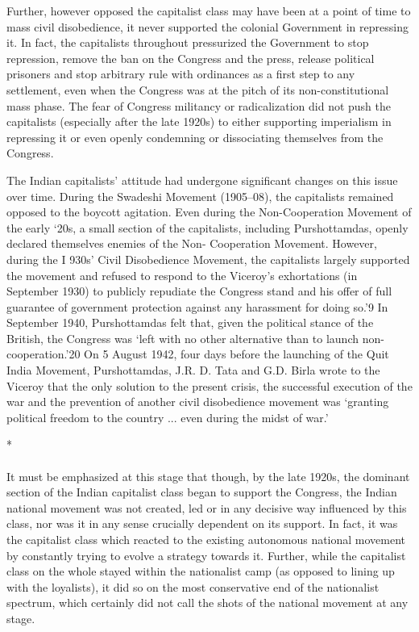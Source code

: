 Further, however opposed the capitalist class may have been at a point of time to mass civil disobedience, it never supported the colonial Government in repressing it. In fact, the capitalists throughout pressurized the Government to stop repression, remove the ban on the Congress and the press, release political prisoners and stop arbitrary rule with ordinances as a first step to any settlement, even when the Congress was at the pitch of its non-constitutional mass phase. The fear of Congress militancy or radicalization did not push the capitalists (especially after the late 1920s) to either supporting imperialism in repressing it or even openly condemning or dissociating themselves from the Congress. 

The Indian capitalists' attitude had undergone significant changes on this issue over time. During the Swadeshi Movement (1905--08), the capitalists remained opposed to the boycott agitation. Even during the Non-Cooperation Movement of the early `20s, a small section of the capitalists, including Purshottamdas, openly declared themselves enemies of the Non- Cooperation Movement. However, during the I 930s' Civil Disobedience Movement, the capitalists largely supported the movement and refused to respond to the Viceroy's exhortations (in September 1930) to publicly repudiate the Congress stand and his offer of full guarantee of government protection against any harassment for doing so.'9 In September 1940, Purshottamdas felt that, given the political stance of the British, the Congress was `left with no other alternative than to launch non-cooperation.'20 On 5 August 1942, four days before the launching of the Quit India Movement, Purshottamdas, J.R. D. Tata and G.D. Birla wrote to the Viceroy that the only solution to the present crisis, the successful execution of the war and the prevention of another civil disobedience movement was `granting political freedom to the country ... even during the midst of war.'

\begin{center}*\end{center}

\paragraph*{}

It must be emphasized at this stage that though, by the late 1920s, the dominant section of the Indian capitalist class began to support the Congress, the Indian national movement was not created, led or in any decisive way influenced by this class, nor was it in any sense crucially dependent on its support. In fact, it was the capitalist class which reacted to the existing autonomous national movement by constantly trying to evolve a strategy towards it. Further, while the capitalist class on the whole stayed within the nationalist camp (as opposed to lining up with the loyalists), it did so on the most conservative end of the nationalist spectrum, which certainly did not call the shots of the national movement at any stage. 

